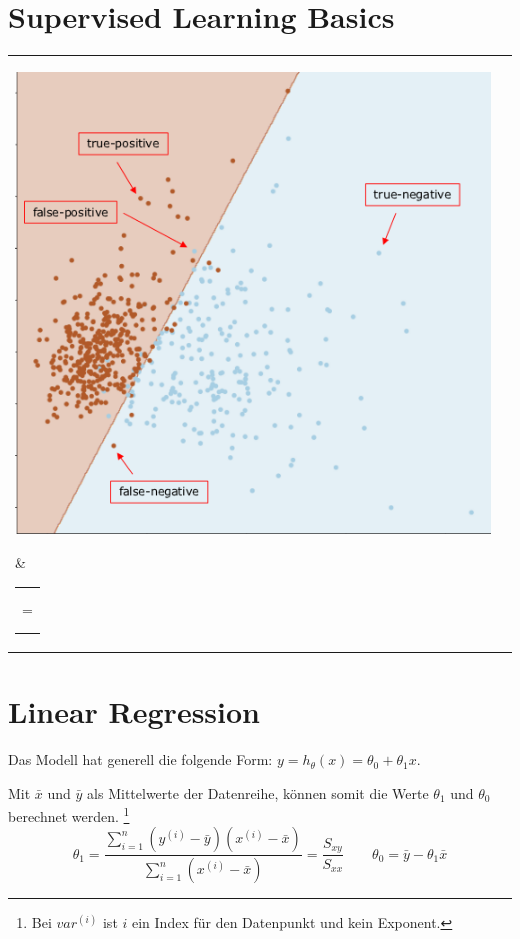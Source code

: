 \documentclass{article}
\begin{document}
\section{Supervised Learning Basics}
\begin{tabular}{l l}
	\parbox[c]{0.3\textwidth}{\includegraphics[width=\linewidth]{true_positive}} &
	\begin{tabular}{l}
		$Accuracy = \frac{TP + TN}{Total}$ \\ $Errorrate = \frac{FP + FN}{Total}$ \\
		$Sensitivity = \frac{TP}{Actual Yes}$ = $\frac{TP}{TP + FN}$ \\ $Specificity = \frac{TN}{ActualNo} = \frac{TN}{TN + FP}$ \\ 
		$Precision = \frac{TP}{Predicted Yes} = \frac{TP}{TP + FP}$
	\end{tabular}
	
\end{tabular}
\section{Linear Regression}
	Das Modell hat generell die folgende Form: $y = h_\theta(x) = \theta_0 + \theta_1 x$.
	
	Mit $\bar{x}$ und $\bar{y}$ als Mittelwerte der Datenreihe, können somit die Werte $\theta_1$ und $\theta_0$ berechnet werden. \footnote{Bei $var^{(i)}$ ist $i$ ein Index für den Datenpunkt und kein Exponent.}
	\[ \theta_1 = \frac{\sum_{i=1}^{n}(y^{(i)}-\bar{y})(x^{(i)}-\bar{x})}{\sum_{i=1}^{n}(x^{(i)}-\bar{x})} = \frac{S_{xy}}{S_{xx}} \qquad
	\theta_0 = \bar{y}-\theta_1 \bar{x} \]
\end{document}
